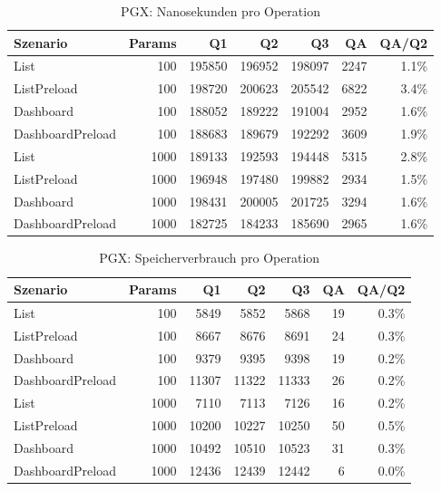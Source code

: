 
\begin{table}[ht]
\caption{PGX: Nanosekunden pro Operation}
\begin{tabular}{lrrrrrr}
\toprule
Szenario & Params & Q1 & Q2 & Q3 & QA & QA/Q2 \\
\midrule
	List & 100 & 195850 & 196952 & 198097 & 2247 & 1.1\% \\
	ListPreload & 100 & 198720 & 200623 & 205542 & 6822 & 3.4\% \\
	Dashboard & 100 & 188052 & 189222 & 191004 & 2952 & 1.6\% \\
	DashboardPreload & 100 & 188683 & 189679 & 192292 & 3609 & 1.9\% \\
	List & 1000 & 189133 & 192593 & 194448 & 5315 & 2.8\% \\
	ListPreload & 1000 & 196948 & 197480 & 199882 & 2934 & 1.5\% \\
	Dashboard & 1000 & 198431 & 200005 & 201725 & 3294 & 1.6\% \\
	DashboardPreload & 1000 & 182725 & 184233 & 185690 & 2965 & 1.6\% \\
\bottomrule
\end{tabular}
\label{tab:benchmark_pgx_nsperop}
\end{table}
	
\begin{table}[ht]
\caption{PGX: Speicherverbrauch pro Operation}
\begin{tabular}{lrrrrrr}
\toprule
Szenario & Params & Q1 & Q2 & Q3 & QA & QA/Q2 \\
\midrule
	List & 100 & 5849 & 5852 & 5868 & 19 & 0.3\% \\
	ListPreload & 100 & 8667 & 8676 & 8691 & 24 & 0.3\% \\
	Dashboard & 100 & 9379 & 9395 & 9398 & 19 & 0.2\% \\
	DashboardPreload & 100 & 11307 & 11322 & 11333 & 26 & 0.2\% \\
	List & 1000 & 7110 & 7113 & 7126 & 16 & 0.2\% \\
	ListPreload & 1000 & 10200 & 10227 & 10250 & 50 & 0.5\% \\
	Dashboard & 1000 & 10492 & 10510 & 10523 & 31 & 0.3\% \\
	DashboardPreload & 1000 & 12436 & 12439 & 12442 & 6 & 0.0\% \\
\bottomrule
\end{tabular}
\label{tab:benchmark_pgx_bytesperop}
\end{table}
	
